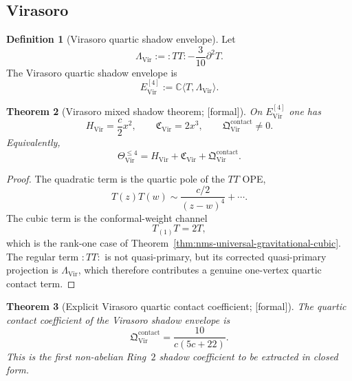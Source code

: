 \documentclass[11pt,oneside]{memoir}
\numberwithin{equation}{chapter}
\newtheorem{theorem}{Theorem}[chapter]
\theoremstyle{definition}
\newtheorem{definition}[theorem]{Definition}
\newcommand{\ClaimStatusProvedHere}{\textnormal{[formal]}}
\begin{document}
\subsection{Virasoro}
\label{subsec:nms-virasoro}

\begin{definition}[Virasoro quartic shadow envelope]
\label{def:nms-virasoro-envelope}
Let
\[
\Lambda_{\mathrm{Vir}}:=:TT:-\frac{3}{10}\partial^2T.
\]
The Virasoro quartic shadow envelope is
\[
E^{[4]}_{\mathrm{Vir}}:=\mathbb C\langle T,\Lambda_{\mathrm{Vir}}\rangle.
\]
\end{definition}

\begin{theorem}[Virasoro mixed shadow theorem; \ClaimStatusProvedHere]
\label{thm:nms-virasoro-mixed-shadow}
On $E^{[4]}_{\mathrm{Vir}}$ one has
\[
H_{\mathrm{Vir}}=\frac{c}{2}x^2,
\qquad
\mathfrak C_{\mathrm{Vir}}=2x^3,
\qquad
\mathfrak Q^{\mathrm{contact}}_{\mathrm{Vir}}\neq 0.
\]
Equivalently,
\[
\Theta_{\mathrm{Vir}}^{\le 4}=H_{\mathrm{Vir}}+\mathfrak C_{\mathrm{Vir}}+\mathfrak Q^{\mathrm{contact}}_{\mathrm{Vir}}.
\]
\end{theorem}

\begin{proof}
The quadratic term is the quartic pole of the $TT$ OPE,
\[
T(z)T(w)\sim \frac{c/2}{(z-w)^4}+\cdots.
\]
The cubic term is the conformal-weight channel
\[
T_{(1)}T=2T,
\]
which is the rank-one case of Theorem~\ref{thm:nms-universal-gravitational-cubic}.  The regular term $:TT:$ is not quasi-primary, but its corrected quasi-primary projection is $\Lambda_{\mathrm{Vir}}$, which therefore contributes a genuine one-vertex quartic contact term.\qedhere
\end{proof}

\begin{theorem}[Explicit Virasoro quartic contact coefficient; \ClaimStatusProvedHere]
\label{thm:nms-virasoro-quartic-explicit}
The quartic contact coefficient of the Virasoro shadow envelope is
\begin{equation}
\label{eq:nms-virasoro-quartic-explicit}
\mathfrak Q^{\mathrm{contact}}_{\mathrm{Vir}}
= \frac{10}{c(5c+22)}.
\end{equation}
This is the first non-abelian Ring~$2$ shadow coefficient to be
extracted in closed form.
\end{theorem}
\end{document}
